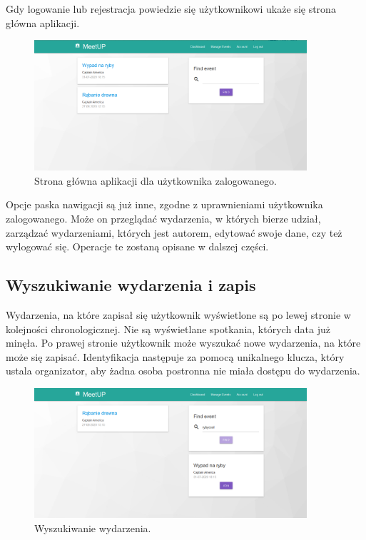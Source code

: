 \documentclass[12pt]{article}
\begin{document}
Gdy logowanie lub rejestracja powiedzie się użytkownikowi ukaże się strona główna aplikacji.

\begin{figure}[H]
\centering
\includegraphics[width=0.9\textwidth]{meetup_dashboard.png}
\caption{Strona główna aplikacji dla użytkownika zalogowanego.}
\end{figure}

Opcje paska nawigacji są już inne, zgodne z uprawnieniami użytkownika zalogowanego. Może on przeglądać wydarzenia, w których bierze udział, zarządzać wydarzeniami, których jest autorem, edytować swoje dane, czy też wylogować się. Operacje te zostaną opisane w dalszej części.

\subsection{Wyszukiwanie wydarzenia i zapis}
Wydarzenia, na które zapisał się użytkownik wyświetlone są po lewej stronie w kolejności chronologicznej. Nie są wyświetlane spotkania, których data już minęła. Po prawej stronie użytkownik może wyszukać nowe wydarzenia, na które może się zapisać. Identyfikacja następuje za pomocą unikalnego klucza, który ustala organizator, aby żadna osoba postronna nie miała dostępu do wydarzenia.

\begin{figure}[H]
\centering
\includegraphics[width=0.9\textwidth]{meetup_find_event.png}
\caption{Wyszukiwanie wydarzenia.}
\end{figure}
\end{document}
